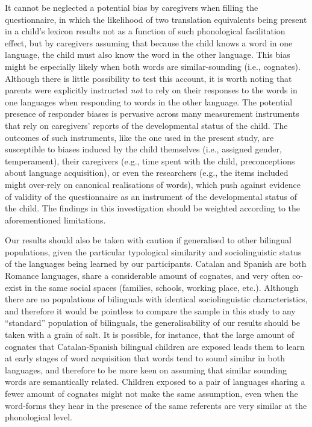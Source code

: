 \documentclass[
  man,
  floatsintext,
  colorlinks=true,linkcolor=blue,citecolor=blue,urlcolor=blue,biblatex]{apa7}
\begin{document}
It cannot be neglected a potential bias by caregivers when filling the
questionnaire, in which the likelihood of two translation equivalents
being present in a child's lexicon results not as a function of such
phonological facilitation effect, but by caregivers assuming that
because the child knows a word in one language, the child must also know
the word in the other language. This bias might be especially likely
when both words are similar-sounding (i.e., cognates). Although there is
little possibility to test this account, it is worth noting that parents
were explicitly instructed \emph{not} to rely on their responses to the
words in one languages when responding to words in the other language.
The potential presence of responder biases is pervasive across many
measurement instruments that rely on caregivers' reports of the
developmental status of the child. The outcomes of such instruments,
like the one used in the present study, are susceptible to biases
induced by the child themselves (i.e., assigned gender, temperament),
their caregivers (e.g., time spent with the child, preconceptions about
language acquisition), or even the researchers (e.g., the items included
might over-rely on canonical realisations of words), which push against
evidence of validity of the questionnaire as an instrument of the
developmental status of the child. The findings in this investigation
should be weighted according to the aforementioned limitations.

Our results should also be taken with caution if generalised to other
bilingual populations, given the particular typological similarity and
sociolinguistic status of the languages being learned by our
participants. Catalan and Spanish are both Romance languages, share a
considerable amount of cognates, and very often co-exist in the same
social spaces (families, schools, working place, etc.). Although there
are no populations of bilinguals with identical sociolinguistic
characteristics, and therefore it would be pointless to compare the
sample in this study to any ``standard'' population of bilinguals, the
generalisability of our results should be taken with a grain of salt. It
is possible, for instance, that the large amount of cognates that
Catalan-Spanish bilingual children are exposed leads them to learn at
early stages of word acquisition that words tend to sound similar in
both languages, and therefore to be more keen on assuming that similar
sounding words are semantically related. Children exposed to a pair of
languages sharing a fewer amount of cognates might not make the same
assumption, even when the word-forms they hear in the presence of the
same referents are very similar at the phonological level.
\end{document}
